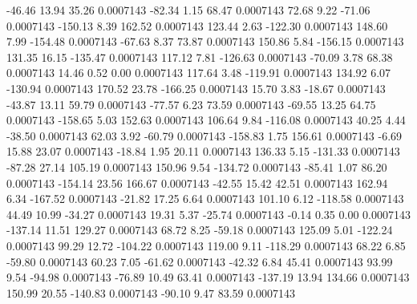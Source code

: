       -46.46       13.94       35.26     0.0007143
      -82.34        1.15       68.47     0.0007143
       72.68        9.22      -71.06     0.0007143
     -150.13        8.39      162.52     0.0007143
      123.44        2.63     -122.30     0.0007143
      148.60        7.99     -154.48     0.0007143
      -67.63        8.37       73.87     0.0007143
      150.86        5.84     -156.15     0.0007143
      131.35       16.15     -135.47     0.0007143
      117.12        7.81     -126.63     0.0007143
      -70.09        3.78       68.38     0.0007143
       14.46        0.52        0.00     0.0007143
      117.64        3.48     -119.91     0.0007143
      134.92        6.07     -130.94     0.0007143
      170.52       23.78     -166.25     0.0007143
       15.70        3.83      -18.67     0.0007143
      -43.87       13.11       59.79     0.0007143
      -77.57        6.23       73.59     0.0007143
      -69.55       13.25       64.75     0.0007143
     -158.65        5.03      152.63     0.0007143
      106.64        9.84     -116.08     0.0007143
       40.25        4.44      -38.50     0.0007143
       62.03        3.92      -60.79     0.0007143
     -158.83        1.75      156.61     0.0007143
       -6.69       15.88       23.07     0.0007143
      -18.84        1.95       20.11     0.0007143
      136.33        5.15     -131.33     0.0007143
      -87.28       27.14      105.19     0.0007143
      150.96        9.54     -134.72     0.0007143
      -85.41        1.07       86.20     0.0007143
     -154.14       23.56      166.67     0.0007143
      -42.55       15.42       42.51     0.0007143
      162.94        6.34     -167.52     0.0007143
      -21.82       17.25        6.64     0.0007143
      101.10        6.12     -118.58     0.0007143
       44.49       10.99      -34.27     0.0007143
       19.31        5.37      -25.74     0.0007143
       -0.14        0.35        0.00     0.0007143
     -137.14       11.51      129.27     0.0007143
       68.72        8.25      -59.18     0.0007143
      125.09        5.01     -122.24     0.0007143
       99.29       12.72     -104.22     0.0007143
      119.00        9.11     -118.29     0.0007143
       68.22        6.85      -59.80     0.0007143
       60.23        7.05      -61.62     0.0007143
      -42.32        6.84       45.41     0.0007143
       93.99        9.54      -94.98     0.0007143
      -76.89       10.49       63.41     0.0007143
     -137.19       13.94      134.66     0.0007143
      150.99       20.55     -140.83     0.0007143
      -90.10        9.47       83.59     0.0007143
